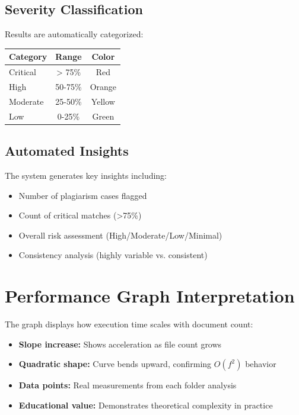 \documentclass[12pt,oneside,openany]{report}
\begin{document}
\subsection{Severity Classification}

Results are automatically categorized:
\begin{table}[H]
\centering
\begin{tabular}{|l|c|c|}
\hline
\textbf{Category} & \textbf{Range} & \textbf{Color} \\
\hline
Critical & > 75\% & Red \\
High & 50-75\% & Orange \\
Moderate & 25-50\% & Yellow \\
Low & 0-25\% & Green \\
\hline
\end{tabular}
\end{table}

\subsection{Automated Insights}

The system generates key insights including:
\begin{itemize}
  \item Number of plagiarism cases flagged
  \item Count of critical matches (>75\%)
  \item Overall risk assessment (High/Moderate/Low/Minimal)
  \item Consistency analysis (highly variable vs. consistent)
\end{itemize}

\section{Performance Graph Interpretation}

The graph displays how execution time scales with document count:

\begin{itemize}
  \item \textbf{Slope increase:} Shows acceleration as file count grows
  \item \textbf{Quadratic shape:} Curve bends upward, confirming $O(f^2)$ behavior
  \item \textbf{Data points:} Real measurements from each folder analysis
  \item \textbf{Educational value:} Demonstrates theoretical complexity in practice
\end{itemize}
\end{document}
